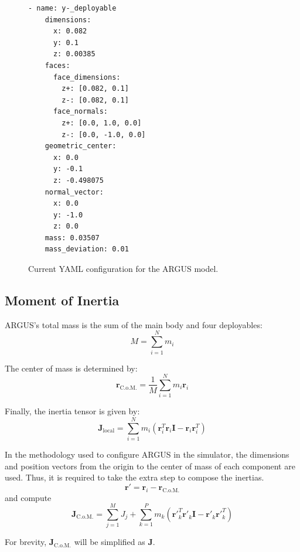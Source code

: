 \documentclass[conference,onecolumn,draftclsnofoot]{IEEEtran}
\begin{document}
\begin{figure}[H]
\begin{minipage}[t]{0.32\linewidth}
\begin{lstlisting}[language={},basicstyle=\ttfamily\tiny,frame=single]
  - name: y-_deployable
    dimensions:
      x: 0.082
      y: 0.1
      z: 0.00385
    faces:
      face_dimensions:
        z+: [0.082, 0.1]
        z-: [0.082, 0.1]
      face_normals:
        z+: [0.0, 1.0, 0.0]
        z-: [0.0, -1.0, 0.0]
    geometric_center:
      x: 0.0
      y: -0.1
      z: -0.498075
    normal_vector:
      x: 0.0
      y: -1.0
      z: 0.0
    mass: 0.03507
    mass_deviation: 0.01
  \end{lstlisting}
  \end{minipage}

  \caption{Current YAML configuration for the ARGUS model.}
  \label{fig:argus-yaml-config}
\end{figure}

\subsection{Moment of Inertia}\label{subsec:moment-of-inertia}
ARGUS's total mass is the sum of the main body and four deployables:
\begin{equation}
M = \sum_{i=1}^{N} m_i
\end{equation}

The center of mass is determined by:
\begin{equation}
\mathbf{r}_{\mathrm{C.o.M.}} = \frac{1}{M}\sum_{i=1}^{N} m_i \mathbf{r}_i 
\end{equation}

Finally, the inertia tensor is given by:
\begin{equation}
\mathbf{J_{\mathrm{local}}} = \sum_{i=1}^{N} m_i \left( \mathbf{r}_i^T \mathbf{r}_i \mathbf{I} - \mathbf{r}_i \mathbf{r}_i^T \right)
\end{equation}

In the methodology used to configure ARGUS in the simulator, the dimensions and position vectors from the origin to the center of mass of each component are used. Thus, it is required to take the extra step to compose the inertias. 
\begin{equation}
\boldsymbol{r}' = \mathbf{r}_i - \mathbf{r}_{\mathrm{C.o.M.}}
\end{equation}
and compute
\begin{equation}
\mathbf{J}_{\mathrm{C.o.M.}} = \sum_{j=1}^{M} J_j + \sum_{k=1}^{P} m_k \left( \mathbf{r'}_k^T \mathbf{r'}_k \mathbf{I} - \mathbf{r'}_k \mathbf{r'}_k^T \right)
\label{eq:Jcom}
\end{equation}

For brevity, $\mathbf{J}_{\mathrm{C.o.M.}}$ will be simplified as $\mathbf{J}$.
\end{document}
